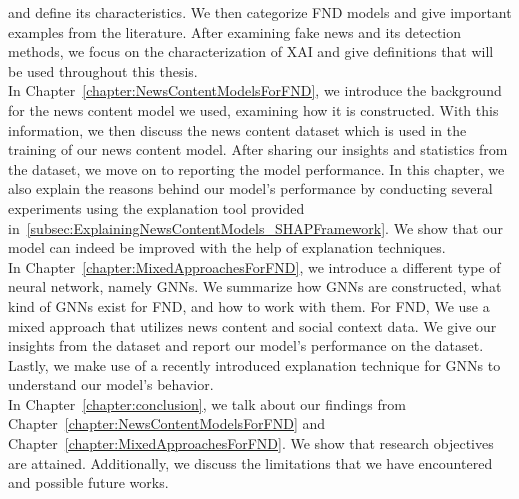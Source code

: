 and define its characteristics. We then categorize FND models and give important examples from the literature. After examining fake news and its detection methods, we focus on the characterization of XAI and give definitions that will be
used throughout this thesis.\\
In Chapter~\ref{chapter:NewsContentModelsForFND}, we introduce the background for the news content model we used, examining how it is constructed. With this information, we then discuss the news content dataset which is used in the training of our news content model. After sharing our insights and statistics from the dataset, we move on to reporting the model performance. In this chapter, we also explain the reasons behind our model's performance by conducting several experiments using the explanation tool provided in~\ref{subsec:ExplainingNewsContentModels_SHAPFramework}. We show that our model can indeed be improved with the help of explanation techniques.\\
In Chapter~\ref{chapter:MixedApproachesForFND}, we introduce a different type of neural network, namely GNNs. We summarize how GNNs are constructed, what kind of GNNs exist for FND, and how to work with them. For FND, We use a mixed approach that utilizes news content and social context data. We give our insights from the dataset and report our model's performance on the dataset. Lastly, we make use of a recently introduced explanation technique for GNNs to understand our model's behavior.\\
In Chapter~\ref{chapter:conclusion}, we talk about our findings from Chapter~\ref{chapter:NewsContentModelsForFND} and Chapter~\ref{chapter:MixedApproachesForFND}. We show that research objectives are attained. Additionally, we discuss the limitations that we have encountered and possible future works.\\





